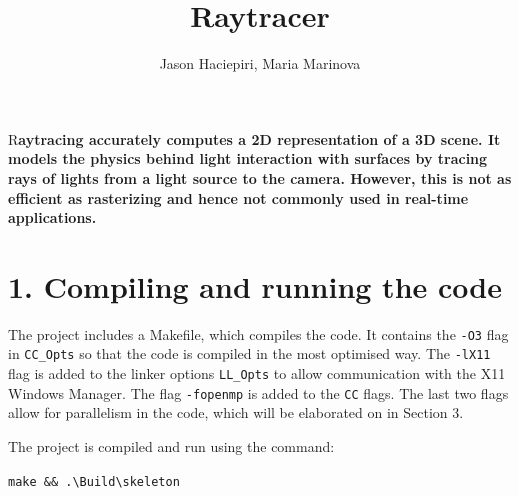 \documentclass[DIV=calc, paper=a4, fontsize=11pt, twocolumn]{article}	 %
\title{Raytracer} %
\author{Jason Haciepiri, Maria Marinova} %
\date{\vspace{-30pt}} %
\newcommand{\initial}[1]{ %
	\lettrine[lines=3,lhang=0.3,nindent=0em]{
		\color{Goldenrod}
		{\textsf{#1}}}{}}
\begin{document}
	
	\maketitle %
	
	\thispagestyle{fancy} %
	
	
	\initial{R}\textbf{aytracing accurately computes a 2D representation of a 3D scene. It models the physics behind light interaction with surfaces by tracing rays of lights from a light source to the camera. However, this is not as efficient as rasterizing and hence not commonly used in real-time applications.}
	
	
	\section*{1. Compiling and running the code}

	The project includes a Makefile, which compiles the code. It contains the \texttt{-O3} flag in \texttt{CC\_Opts} so that the code is compiled in the most optimised way. The \texttt{-lX11} flag is added to the linker options \texttt{LL\_Opts} to allow communication with the X11 Windows Manager. The flag \texttt{-fopenmp} is added to the \texttt{CC} flags. The last two flags allow for parallelism in the code, which will be elaborated on in Section 3. 
	\par
	The project is compiled and run using the command: \par
	\texttt{make \&\&  .\textbackslash Build\textbackslash skeleton} 
\end{document}

